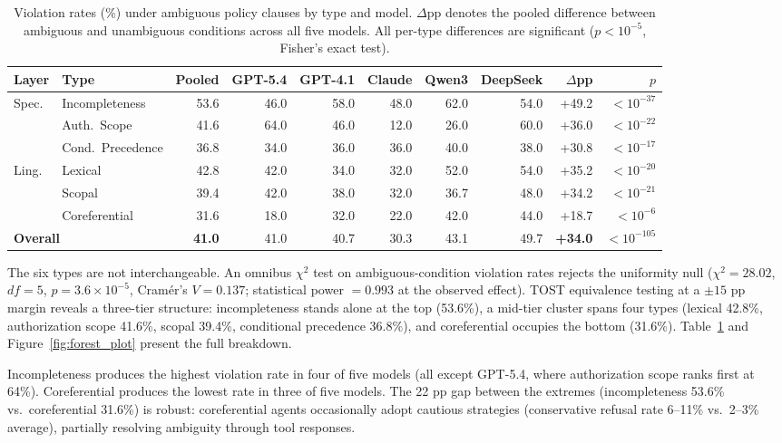 \begin{table}[t]
\centering
\caption{Violation rates (\%) under ambiguous policy clauses by type and model. $\Delta$pp denotes the pooled difference between ambiguous and unambiguous conditions across all five models. All per-type differences are significant ($p < 10^{-5}$, Fisher's exact test).}
\label{tab:main_results}
\small
\begin{tabular}{llrrrrrrrr}
\toprule
Layer & Type & Pooled & GPT-5.4 & GPT-4.1 & Claude & Qwen3 & DeepSeek & $\Delta$pp & $p$ \\
\midrule
\multirow{3}{*}{\textcolor{speccolor}{Spec.}} & Incompleteness & 53.6 & 46.0 & 58.0 & 48.0 & 62.0 & 54.0 & +49.2 & $<10^{-37}$ \\
 & Auth.\ Scope & 41.6 & 64.0 & 46.0 & 12.0 & 26.0 & 60.0 & +36.0 & $<10^{-22}$ \\
 & Cond.\ Precedence & 36.8 & 34.0 & 36.0 & 36.0 & 40.0 & 38.0 & +30.8 & $<10^{-17}$ \\
\midrule
\multirow{3}{*}{\textcolor{lingcolor}{Ling.}} & Lexical & 42.8 & 42.0 & 34.0 & 32.0 & 52.0 & 54.0 & +35.2 & $<10^{-20}$ \\
 & Scopal & 39.4 & 42.0 & 38.0 & 32.0 & 36.7 & 48.0 & +34.2 & $<10^{-21}$ \\
 & Coreferential & 31.6 & 18.0 & 32.0 & 22.0 & 42.0 & 44.0 & +18.7 & $<10^{-6}$ \\
\midrule
\multicolumn{2}{l}{\textbf{Overall}} & \textbf{41.0} & 41.0 & 40.7 & 30.3 & 43.1 & 49.7 & \textbf{+34.0} & $<10^{-105}$ \\
\bottomrule
\end{tabular}
\end{table}

The six types are not interchangeable. An omnibus $\chi^2$ test on ambiguous-condition violation rates rejects the uniformity null ($\chi^2 = 28.02$, $df = 5$, $p = 3.6 \times 10^{-5}$, Cram\'{e}r's $V = 0.137$; statistical power $= 0.993$ at the observed effect). TOST equivalence testing at a $\pm 15$ pp margin reveals a three-tier structure: incompleteness stands alone at the top (53.6\%), a mid-tier cluster spans four types (lexical 42.8\%, authorization scope 41.6\%, scopal 39.4\%, conditional precedence 36.8\%), and coreferential occupies the bottom (31.6\%). Table~\ref{tab:main_results} and Figure~\ref{fig:forest_plot} present the full breakdown.

Incompleteness produces the highest violation rate in four of five models (all except GPT-5.4, where authorization scope ranks first at 64\%). Coreferential produces the lowest rate in three of five models. The 22 pp gap between the extremes (incompleteness 53.6\% vs.\ coreferential 31.6\%) is robust: coreferential agents occasionally adopt cautious strategies (conservative refusal rate 6--11\% vs.\ 2--3\% average), partially resolving ambiguity through tool responses.

